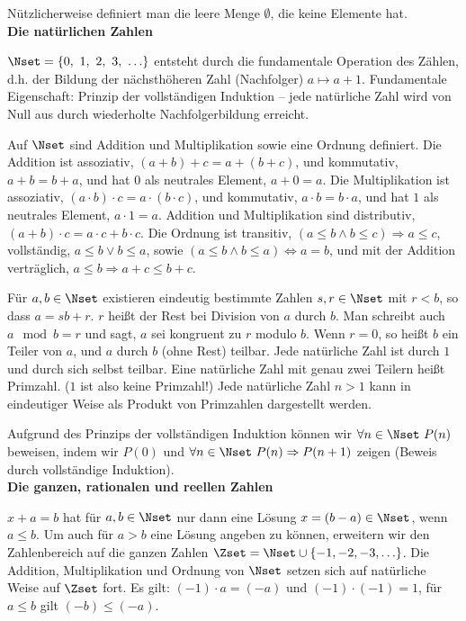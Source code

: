 \documentclass[a4paper,10pt]{article}
\begin{document}
Nützlicherweise definiert man die leere Menge $\emptyset$, die keine Elemente hat.\\


{\bf Die natürlichen Zahlen}

$\Nset = \{ 0,~1,~2,~3,~\ldots\}$ entsteht durch die fundamentale Operation des Zählen, d.h. der Bildung der nächsthöheren Zahl (Nachfolger) $a\mapsto a+1$.
Fundamentale Eigenschaft: Prinzip der vollständigen Induktion -- jede natürliche Zahl wird von Null aus durch wiederholte Nachfolgerbildung erreicht.

Auf $\Nset$ sind Addition und Multiplikation sowie eine Ordnung definiert.
Die Addition ist assoziativ, $(a+b)+c=a+(b+c)$, und kommutativ, $a+b=b+a$, und hat $0$ als neutrales Element, $a+0=a$. Die Multiplikation
ist assoziativ, $(a\cdot b)\cdot c=a\cdot (b\cdot c)$, und kommutativ, $a\cdot b=b\cdot a$, und hat $1$ als neutrales Element, $a\cdot 1=a$.
Addition und Multiplikation sind distributiv, $(a+b)\cdot c=a\cdot c+b\cdot c$.
Die Ordnung
ist transitiv, $(a\le b \wedge b\le c)\Rightarrow a\le c$,
vollständig, $a\le b \vee b\le a$, sowie $(a\le b\wedge b\le a)\Leftrightarrow a=b$, und mit der Addition verträglich, $a\le b\Rightarrow a+c\le b+c$.

Für $a,b\in\Nset$ existieren eindeutig bestimmte Zahlen $s,r\in\Nset$
mit $r<b$, so dass $a=sb+r$. $r$ heißt der Rest bei Division von $a$ durch $b$. Man schreibt auch $a\mod b=r$ und sagt, $a$ sei kongruent zu $r$ modulo $b$. Wenn $r=0$, so heißt $b$ ein Teiler von $a$, und $a$ durch $b$ (ohne Rest)
teilbar. Jede natürliche Zahl ist durch $1$ und durch sich selbst teilbar. Eine natürliche Zahl mit genau zwei Teilern heißt Primzahl. ($1$ ist also keine Primzahl!) Jede natürliche Zahl $n>1$ kann in eindeutiger Weise als Produkt von
      Primzahlen dargestellt werden.

Aufgrund des Prinzips der vollständigen Induktion können wir
$\forall n\in\Nset~P(n)$ beweisen, indem wir $P(0)$ und
$\forall n\in\Nset~P(n)\Rightarrow P(n+1)$ zeigen (Beweis durch vollständige Induktion).\\

{\bf Die ganzen, rationalen und reellen Zahlen}

$x+a=b$ hat für $a,b\in\Nset$ nur dann eine Lösung $x=(b-a)\in\Nset$, wenn $a\le b$. Um auch für $a>b$ eine Lösung angeben zu können, erweitern wir den Zahlenbereich auf die ganzen Zahlen $\Zset=\Nset\cup \{-1,-2,-3,\ldots\}$. Die Addition, Multiplikation und Ordnung von $\Nset$ setzen sich auf natürliche Weise auf $\Zset$ fort. Es gilt: $(-1)\cdot a=(-a)$ und $(-1)\cdot(-1)=1$, für $a\le b$ gilt $(-b)\le (-a)$.
\end{document}
